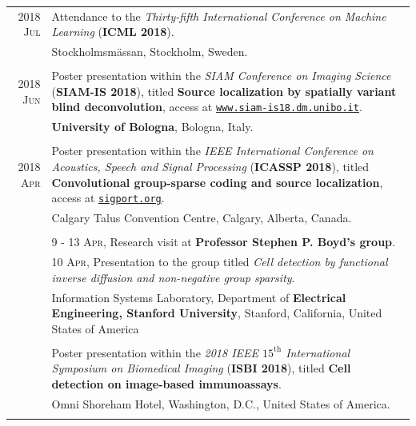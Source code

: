 \documentclass[a4paper,10pt]{article}
\begin{document}
\begin{longtable}[H]{r|p{13.5cm}}
      \textsc{2018 Jul} & Attendance to the \emph{Thirty-fifth International Conference on Machine
						  Learning} (\textbf{ICML 2018}). \\
						& \footnotesize{Stockholmsm\"{a}ssan, Stockholm, Sweden.} \\
	  \multicolumn{2}{c}{} \\
						
      \textsc{2018 Jun} & Poster presentation within the \emph{SIAM Conference on Imaging Science}
			  (\textbf{SIAM-IS 2018}), titled \textbf{Source localization by spatially
			  variant blind deconvolution}, access at \href{https://www.siam-is18.dm.unibo.it/uploads/store/a7a8b242b168225d0be8998fa373f58b.pdf}{\texttt{www.siam-is18.dm.unibo.it}}. \\
			& \footnotesize{\textbf{University of Bologna}, Bologna, Italy.}\\
      \multicolumn{2}{c}{} \\
    
      \textsc{2018 Apr} & Poster presentation within the \emph{IEEE International Conference 
			  on Acoustics, Speech and Signal Processing} (\textbf{ICASSP 2018}), titled
			  \textbf{Convolutional group-sparse coding and source localization}, access at \href{https://sigport.org/documents/convolutional-group-sparse-coding-and-source-localization}{\texttt{sigport.org}}. \\
			& \footnotesize{Calgary Talus Convention Centre, Calgary, Alberta, Canada.} \\
			& \\
			& \textsc{9 - 13 Apr}, Research visit at \textbf{Professor Stephen P. Boyd's group}. \\
			& \textsc{10 Apr}, Presentation to the group titled 
              \emph{Cell detection by functional inverse diffusion and non-negative group sparsity}.\\
			& \footnotesize{Information Systems Laboratory, Department of \textbf{Electrical Engineering, 
			  Stanford University}, Stanford, California, United States of America} \\
			& \\
			& Poster presentation within the \emph{2018 IEEE $15^{\mathrm{th}}$ International
			  Symposium on Biomedical Imaging} (\textbf{ISBI 2018}), titled
			  \textbf{Cell detection on image-based immunoassays}.\\
			& \footnotesize{Omni Shoreham Hotel, Washington, D.C., United States of America.} \\
      \multicolumn{2}{c}{} \\
      

\end{longtable}
\end{document}
